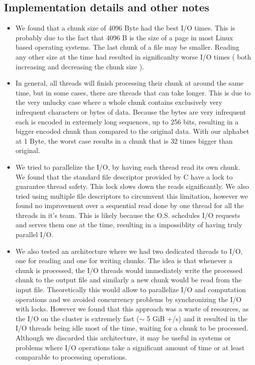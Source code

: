 \subsection{Implementation details and other notes}

\begin{itemize}

\item We found that a chunk size of 4096 Byte had the best I/O times. This is probably due to the fact that 4096 B is the size of a page in most Linux based operating systems. The last chunk of a file may be smaller. Reading any other size at the time had resulted in significanlty worse I/O times ( both increasing and decreasing the chunk size ).

\item In general, all threads will finish processing their chunk at around the same time, but in some cases, there are threads that can take longer. This is due to the very unlucky case where a whole chunk contains exclusively very infrequent characters or bytes of data. Because the bytes are very infrequent each is encoded in extremely long sequences, up to 256 bits, resulting in a bigger encoded chunk than compared to the original data. With our alphabet at 1 Byte, the worst case results in a chunk that is 32 times bigger than original.

\item We tried to parallelize the I/O, by having each thread read its own chunk. We found that the standard file descriptor provided by C have a lock to guarantee thread safety.  This lock slows down the reads significantly. We also tried using multiple file descriptors to circumvent this limitation, however we found no improvement over a sequential read done by one thread for all the threads in it's team. This is likely because the O.S. schedules I/O requests and serves them one at the time, resulting in a impossiblity of having truly parallel I/O.

\item We also tested an architecture where we had two dedicated threads to I/O, one for reading and one for writing chunks. The idea is that whenever a chunk is processed, the I/O threads would immediately write the processed chunk to the output file and similarly a new chunk would be read from the input file. Theoretically this would allow to parallelize I/O and computation operations and we avoided concurrency problems by synchronizing the I/O with locks. However we found that this approach was a waste  of resources, as the I/O on the cluster is extremely fast ($\sim$ 5 GiB +/s) and it resulted in the I/O threads being idle most of the time, waiting for a chunk to be processed. Although we discarded this architecture, it may be useful in systems or problems where I/O operations take a significant amount of time or at least comparable to processing operations. 

\end{itemize}
